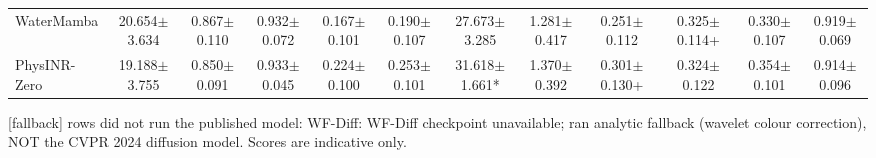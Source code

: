 \documentclass[journal]{IEEEtran}
\begin{document}
\begin{table}
{\begin{tabular}{lccccccccccc}
WaterMamba & 20.654$\pm$3.634 & 0.867$\pm$0.110 & 0.932$\pm$0.072 & 0.167$\pm$0.101 & 0.190$\pm$0.107 & 27.673$\pm$3.285 & 1.281$\pm$0.417 & 0.251$\pm$0.112 & 0.325$\pm$0.114+ & 0.330$\pm$0.107 & 0.919$\pm$0.069 \\
PhysINR-Zero & 19.188$\pm$3.755 & 0.850$\pm$0.091 & 0.933$\pm$0.045 & 0.224$\pm$0.100 & 0.253$\pm$0.101 & 31.618$\pm$1.661* & 1.370$\pm$0.392 & 0.301$\pm$0.130+ & 0.324$\pm$0.122 & 0.354$\pm$0.101 & 0.914$\pm$0.096 \\
\bottomrule
\end{tabular}
}
\par\smallskip\footnotesize [fallback] rows did not run the published model:
WF-Diff: WF-Diff checkpoint unavailable; ran analytic fallback (wavelet colour correction), NOT the CVPR 2024 diffusion model. Scores are indicative only.
\end{table}
\end{document}
